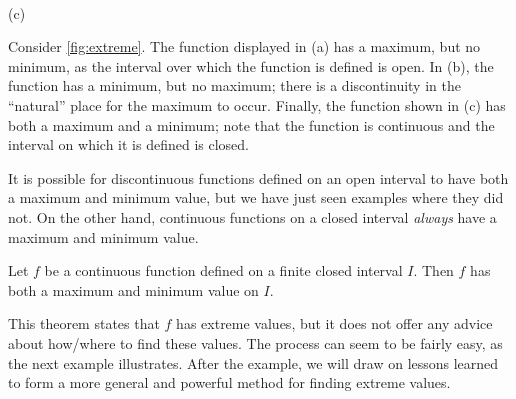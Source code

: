 {
\\(c)}

Consider \autoref{fig:extreme}. The function displayed in (a) has a maximum, but no minimum, as the interval over which the function is defined is open. In (b), the function has a minimum, but no maximum; there is a discontinuity in the ``natural'' place for the maximum to occur. Finally, the function shown in (c) has both a maximum and a minimum; note that the function is continuous and the interval on which it is defined is closed. 
 
It is possible for discontinuous functions defined on an open interval to have both a maximum and minimum value, but we have just seen examples where they did not. On the other hand, continuous functions on a closed interval \emph{always} have a maximum and minimum value.
 
\begin{theorem}\label{thm:extremeVal}%
Let $f$ be a continuous function defined on a finite closed interval $I$. Then $f$ has both a maximum and minimum value on $I$.%
\end{theorem}


This theorem states that $f$ has extreme values, but it does not offer any advice about how/where to find these values. The process can seem to be fairly easy, as the next example illustrates. After the example, we will draw on lessons learned to form a more general and powerful method for finding extreme values.


